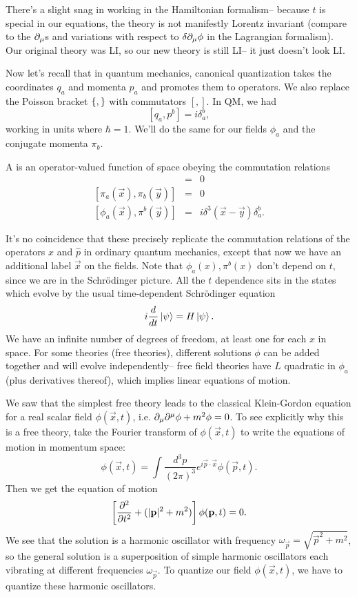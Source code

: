 There's a slight snag in working in the Hamiltonian formalism-- because $t$ is special in our equations, the theory is not manifestly Lorentz invariant (compare to the $\p_\mu$s and variations with respect to $\delta \p_\mu \phi$ in the Lagrangian formalism). Our original theory was LI, so our new theory is still LI-- it just doesn't look LI.

Now let's recall that in quantum mechanics, canonical quantization takes the coordinates $q_a$ and momenta $p_a$ and promotes them to operators. We also replace the Poisson bracket $\set{,}$ with commutators $[,]$. In QM, we had
$$[q_a,p^b]= i \delta_a^b,$$
working in units where $\hbar=1$. We'll do the same for our fields $\phi_a$ and the conjugate momenta $\pi_b$.

\begin{defn}
A  is an operator-valued function of space obeying the commutation relations
\begin{eqnarray}
[\phi_a(\vec{x}),\phi_b(\vec{y})]&=&0 \\
{[\pi_a(\vec{x}),\pi_b (\vec{y})]} &=&0\\
{[\phi_a(\vec{x}),\pi^b (\vec{y})]}&=&i \delta^3(\vec{x}-\vec{y}) \delta_a^b.
\end{eqnarray}
\end{defn}

It's no coincidence that these precisely replicate the commutation relations of the operators $\hat x$ and $\hat p$ in ordinary quantum mechanics, except that now we have an additional label $\vec x$ on the fields. Note that $\phi_a(x), \pi^b(x)$ don't depend on $t$, since we are in the Schr\"odinger picture. All the $t$ dependence sits in the states which evolve by the usual time-dependent Schr\"odinger equation
$$i\frac{d}{dt} \ket{\psi}=H\ket{\psi}.$$
We have an infinite number of degrees of freedom, at least one for each $x$ in space. For some theories (free theories), different solutions $\phi$ can be added together and will evolve independently-- free field theories have $L$ quadratic in $\phi_a$ (plus derivatives thereof), which implies linear equations of motion.

We saw that the simplest free theory leads to the classical Klein-Gordon equation for a real scalar field $\phi(\vec{x},t)$, i.e. $\p_\mu \p^\mu \phi+m^2\phi=0$. To see explicitly why this is a free theory, take the Fourier transform of $\phi(\vec x,t)$ to write the equations of motion in momentum space:
$$\phi(\vec{x},t)=\int \frac{d^3 p}{(2\pi)^3} e^{i \vec{p}\cdot \vec{x}}\phi (\vec{p},t).$$
Then we get the equation of motion
$$\left[\P[2]{}{t}+(|\vec{p}|^2+m^2)\right] \phi(\vec{p},t)=0.$$
We see that the solution is a harmonic oscillator with frequency $\omega_{\vec p} = \sqrt{\vec{p}^2 +m^2}$, so the general solution is a superposition of simple harmonic oscillators each vibrating at different frequencies $\omega_{\vec{p}}$. To quantize our field $\phi(\vec{x},t)$, we have to quantize these harmonic oscillators.

